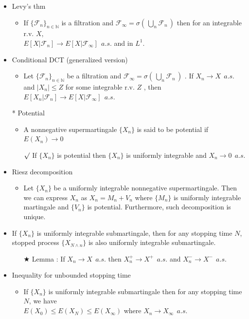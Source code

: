 \documentclass[12pt, A4]{article}
\newcommand{\rmk}{$\surd$}
\newcommand{\trick}{$\bigstar$}
\newcommand{\N}{\mathbb{N}}
\newcommand{\F}{\mathcal{F}}
\begin{document}
\begin{itemize}
\begin{itemize}
	\end{itemize} 
	\item Levy's thm
	\begin{itemize}
		\item If $\{\F_n\}_{n\in \N}$ is a filtration and $\F_\infty=\sigma(\,\bigcup_n \F_n\,)$ then for an integrable r.v. $X$, \\ $E[X|\F_n]\rightarrow E[X|\F_\infty]\;\,a.s.$ and in $L^1$.
	\end{itemize}
	\item Conditional DCT (generalized version)
	\begin{itemize}
		\item Let $\{\F_n\}_{n\in \N}$ be a filtration and $\F_\infty=\sigma(\,\bigcup_n \F_n\,)$ . If $X_n\rightarrow X\;\,a.s.$ and $|X_n|\leq Z$ for some integrable r.v. $Z$ , then $E[X_n|\F_n]\rightarrow E[X|\F_\infty]\;\,a.s.$ 
	\end{itemize} 
	\item[*] Potential
	\begin{itemize}
		\item A nonnegative supermartingale $\{X_n\}$ is said to be potential if $E(X_n)\rightarrow 0$
		\item[\rmk] If $\{X_n\}$ is potential then $\{X_n\}$ is uniformly integrable and $X_n\rightarrow 0\;\,a.s.$
	\end{itemize} 
	\item Riesz decomposition
	\begin{itemize}
		\item Let $\{X_n\}$ be a uniformly integrable nonnegative supermartingale. Then we can express $X_n$ as $X_n=M_n+V_n$ where $\{M_n\}$ is uniformly integrable martingale and $\{V_n\}$ is potential. Furthermore, such decomposition is unique. 
	\end{itemize}
	\item If $\{X_n\}$ is uniformly integrable submartingale, then for any stopping time $N$, stopped process $\{X_{N\wedge n}\}$ is also uniformly integrable submartingale.
	\begin{itemize}
		\item[\trick] Lemma : If $X_n\rightarrow X\;\, a.s.$ then $X_n^+\rightarrow X^+\;\,a.s.$ and $X_n^-\rightarrow X^-\;\,a.s.$
	\end{itemize}
	\item Inequality for unbounded stopping time
	\begin{itemize}
		\item If $\{X_n\}$ is uniformly integrable submartingale then for any stopping time $N$, we have \\$E(X_0)\leq E(X_N)\leq E(X_\infty)$ where $X_n\rightarrow X_\infty\;\,a.s.$

\end{itemize}
\end{itemize}
\end{document}
